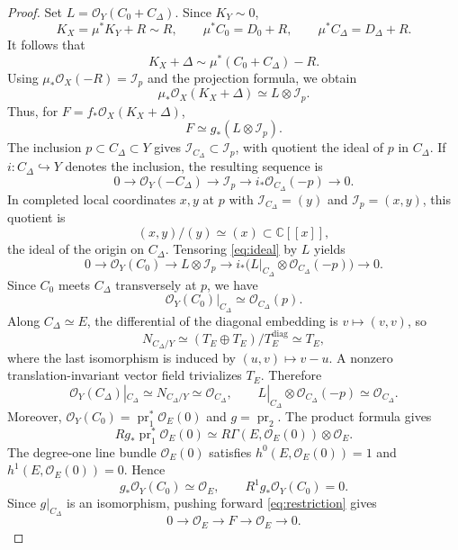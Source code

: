 \documentclass[11pt,letterpaper]{article}
\theoremstyle{paper}
\newcommand{\OO}{\mathcal O}
\newcommand{\II}{\mathcal I}
\newcommand{\CC}{\mathbb C}
\DeclareMathOperator{\pr}{pr}
\begin{document}
\begin{proof}
Set $L=\OO_Y(C_0+C_\Delta)$. Since $K_Y\sim0$,
\[
K_X=\mu^*K_Y+R\sim R,\qquad \mu^*C_0=D_0+R,\qquad \mu^*C_\Delta=D_\Delta+R.
\]
It follows that
\[
K_X+\Delta\sim\mu^*(C_0+C_\Delta)-R.
\]
Using $\mu_*\OO_X(-R)=\II_p$ and the projection formula, we obtain
\[
\mu_*\OO_X(K_X+\Delta)\simeq L\otimes\II_p.
\]
Thus, for $F=f_*\OO_X(K_X+\Delta)$,
\begin{equation}\label{eq:F}
F\simeq g_*(L\otimes\II_p).
\end{equation}
The inclusion $p\subset C_\Delta\subset Y$ gives $\II_{C_\Delta}\subset\II_p$, with quotient the ideal of $p$ in $C_\Delta$. If $i:C_\Delta\hookrightarrow Y$ denotes the inclusion, the resulting sequence is
\begin{equation}\label{eq:ideal}
0\longrightarrow\OO_Y(-C_\Delta)\longrightarrow\II_p\longrightarrow i_*\OO_{C_\Delta}(-p)\longrightarrow0.
\end{equation}
In completed local coordinates $x,y$ at $p$ with $\II_{C_\Delta}=(y)$ and $\II_p=(x,y)$, this quotient is
\[
(x,y)/(y)\simeq(x)\subset\CC[[x]],
\]
the ideal of the origin on $C_\Delta$. Tensoring \eqref{eq:ideal} by $L$ yields
\begin{equation}\label{eq:restriction}
0\longrightarrow\OO_Y(C_0)\longrightarrow L\otimes\II_p
\longrightarrow i_*\bigl(L|_{C_\Delta}\otimes\OO_{C_\Delta}(-p)\bigr)\longrightarrow0.
\end{equation}
Since $C_0$ meets $C_\Delta$ transversely at $p$, we have
\[
\OO_Y(C_0)|_{C_\Delta}\simeq\OO_{C_\Delta}(p).
\]
Along $C_\Delta\simeq E$, the differential of the diagonal embedding is $v\mapsto(v,v)$, so
\[
N_{C_\Delta/Y}\simeq(T_E\oplus T_E)/T_E^{\mathrm{diag}}\simeq T_E,
\]
where the last isomorphism is induced by $(u,v)\mapsto v-u$. A nonzero translation-invariant vector field trivializes $T_E$. Therefore
\[
\OO_Y(C_\Delta)|_{C_\Delta}\simeq N_{C_\Delta/Y}\simeq\OO_{C_\Delta},
\qquad L|_{C_\Delta}\otimes\OO_{C_\Delta}(-p)\simeq\OO_{C_\Delta}.
\]
Moreover, $\OO_Y(C_0)=\pr_1^*\OO_E(0)$ and $g=\pr_2$. The product formula gives
\[
Rg_*\pr_1^*\OO_E(0)\simeq R\Gamma(E,\OO_E(0))\otimes\OO_E.
\]
The degree-one line bundle $\OO_E(0)$ satisfies $h^0(E,\OO_E(0))=1$ and $h^1(E,\OO_E(0))=0$. Hence
\begin{equation}\label{eq:product}
g_*\OO_Y(C_0)\simeq\OO_E,\qquad R^1g_*\OO_Y(C_0)=0.
\end{equation}
Since $g|_{C_\Delta}$ is an isomorphism, pushing forward \eqref{eq:restriction} gives
\begin{equation}\label{eq:extension}
0\longrightarrow\OO_E\longrightarrow F\longrightarrow\OO_E\longrightarrow0.

\end{equation}
\end{proof}
\end{document}
